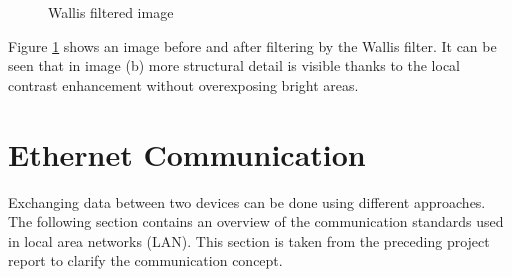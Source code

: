 \begin{figure}[t!]%
    \centering
    \qquad
    \caption{Wallis filtered image}%
    \label{fig:mission:wallisoutputimages}%
\end{figure}

Figure \ref{fig:mission:wallisoutputimages} shows an image before and after
filtering by the Wallis filter. It can be seen that in image (b) more
structural detail is visible thanks to the local contrast enhancement without
overexposing bright areas.

%
%
\section{Ethernet Communication} \label{chapt:theory:ethernet}
Exchanging data between two devices can be done using different approaches. The
following section contains an overview of the communication standards used in
local area networks (LAN). This section is taken from the preceding project
report \cite{p5report} to clarify the communication concept.



